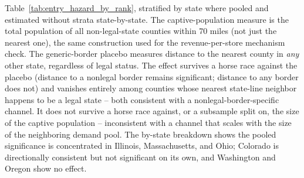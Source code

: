 \begin{table}[htbp]
\begin{minipage}{0.95\textwidth}
Table~\ref{tab:entry_hazard_by_rank}, stratified by state where pooled and estimated without strata
state-by-state. The captive-population measure is the total population of all non-legal-state counties
within 70 miles (not just the nearest one), the same construction used for the revenue-per-store mechanism
check. The generic-border placebo measures distance to the nearest county in \emph{any} other state,
regardless of legal status. The effect survives a horse race against the placebo (distance to a nonlegal
border remains significant; distance to any border does not) and vanishes entirely among counties whose
nearest state-line neighbor happens to be a legal state -- both consistent with a nonlegal-border-specific
channel. It does not survive a horse race against, or a subsample split on, the size of the captive
population -- inconsistent with a channel that scales with the size of the neighboring demand pool. The
by-state breakdown shows the pooled significance is concentrated in Illinois, Massachusetts, and Ohio;
Colorado is directionally consistent but not significant on its own, and Washington and Oregon show no
effect.
\end{minipage}
\end{table}
